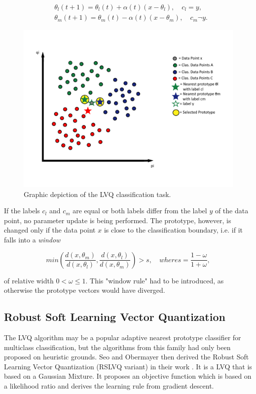 \documentclass[12pt,oneside,a4paper,parskip]{scrbook}
\begin{document}
\begin{equation}
  \begin{split}
    &\theta_l(t+1) = \theta_l(t) + \alpha(t)(x-\theta_l), \quad c_l = y,\\
    &\theta_m(t+1) = \theta_m(t) - \alpha(t)(x-\theta_m), \quad c_m \neg y.
  \end{split}
  \label{equ:LVQ3}
\end{equation}

\begin{figure}[H]
  \includegraphics[width=0.75\linewidth]{LVQ}
  \caption{Graphic depiction of the LVQ classification task.}
  \label{fig:LVQ}
\end{figure}

If the labels $c_l$ and $c_m$ are equal or both labels differ from the label $y$ of the data point, no parameter update is being performed.
The prototype, however, is changed only if the data point $x$ is close to the classification boundary, i.e.
if it falls into a \textit{window}

\begin{equation}
    min(\frac{d(x,\theta_m)}{d(x,\theta_l)},\frac{d(x,\theta_l)}{d(x,\theta_m)}) > s, \quad where s = \frac{1-\omega}{1+\omega},
\end{equation}

of relative width $0<\omega\leq1$. This "window rule" had to be introduced, as otherwise the prototype vectors would have diverged. \cite{RSLVQOrig}

\subsection{Robust Soft Learning Vector Quantization}

The LVQ algorithm may be a popular adaptive nearest prototype classifier for multiclass classification, 
but the algorithms from this family had only been proposed on heuristic grounds. Seo and Obermayer then derived the 
Robust Soft Learning Vector Quantization (RSLVQ variant) in their work \cite{RSLVQOrig}. It is a LVQ that is based on 
a Gaussian Mixture. It proposes an objective function which is based on a likelihood ratio and derives the
learning rule from gradient descent.
\end{document}
